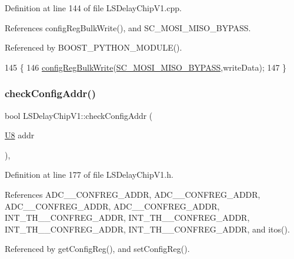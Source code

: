 Definition at line 144 of file L\+S\+Delay\+Chip\+V1.\+cpp.



References config\+Reg\+Bulk\+Write(), and S\+C\+\_\+\+M\+O\+S\+I\+\_\+\+M\+I\+S\+O\+\_\+\+B\+Y\+P\+A\+SS.



Referenced by B\+O\+O\+S\+T\+\_\+\+P\+Y\+T\+H\+O\+N\+\_\+\+M\+O\+D\+U\+L\+E().


\begin{DoxyCode}
145 \{
146     \hyperlink{classLSDelayChipV1_afa626b5d52f8723bcaa3205d1cc7a0f8}{configRegBulkWrite}(\hyperlink{ICECALv3_8h_a2870f5a3cad23b2b4e7f16faefe8ef2e}{SC\_MOSI\_MISO\_BYPASS},writeData);
147 \}
\end{DoxyCode}
\mbox{\label{classLSDelayChipV1_aa8118972150a9e1e95e9006e003c0206}} 
\subsubsection{\texorpdfstring{check\+Config\+Addr()}{checkConfigAddr()}}
{\footnotesize\ttfamily bool L\+S\+Delay\+Chip\+V1\+::check\+Config\+Addr (\begin{DoxyParamCaption}\item[{\hyperlink{ICECALv3_8h_a3cb25ca6f51f003950f9625ff05536fc}{U8}}]{addr }\end{DoxyParamCaption})\hspace{0.3cm}{\ttfamily [inline]}, {\ttfamily [private]}}



Definition at line 177 of file L\+S\+Delay\+Chip\+V1.\+h.



References A\+D\+C\+\_\+\_\+\+C\+O\+N\+F\+R\+E\+G\+\_\+\+A\+D\+DR, A\+D\+C\+\_\+\_\+\+C\+O\+N\+F\+R\+E\+G\+\_\+\+A\+D\+DR, A\+D\+C\+\_\+\_\+\+C\+O\+N\+F\+R\+E\+G\+\_\+\+A\+D\+DR, A\+D\+C\+\_\+\_\+\+C\+O\+N\+F\+R\+E\+G\+\_\+\+A\+D\+DR, I\+N\+T\+\_\+\+T\+H\+\_\+\_\+\+C\+O\+N\+F\+R\+E\+G\+\_\+\+A\+D\+DR, I\+N\+T\+\_\+\+T\+H\+\_\+\_\+\+C\+O\+N\+F\+R\+E\+G\+\_\+\+A\+D\+DR, I\+N\+T\+\_\+\+T\+H\+\_\+\_\+\+C\+O\+N\+F\+R\+E\+G\+\_\+\+A\+D\+DR, I\+N\+T\+\_\+\+T\+H\+\_\+\_\+\+C\+O\+N\+F\+R\+E\+G\+\_\+\+A\+D\+DR, and itos().



Referenced by get\+Config\+Reg(), and set\+Config\+Reg().


